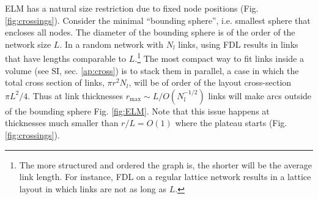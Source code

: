 \documentclass[nofootinbib,preprint,floatfix]{revtex4} %
\begin{document}
ELM has a natural size restriction due to fixed node positions (Fig. \ref{fig:crossings}).
Consider the minimal ``bounding sphere'', i.e. smallest sphere that encloses all nodes. 
The diameter of the bounding sphere is of the order of the network size $L$. 
In a random network with $N_l$ links, using FDL results in links that have lengths comparable to $L$.\footnote{The more structured and ordered the graph is, the shorter will be the average link length. 
For instance, FDL on a regular lattice network results in a lattice layout in which links are not as long as $L$.} 
The most compact way to fit links inside a volume (see SI, sec. \ref{ap:cross}) is to stack them in parallel, a case in which the total cross section of links, $\pi r^2 N_l$, will be of order of the layout cross-section $\pi L^2/4$. 
Thus at link thicknesses $r_\mathrm{max} \sim L/O(N_l^{-1/2})$ links will make arcs outside of the bounding sphere %
Fig. \ref{fig:ELM}. Note that this issue happens at thicknesses much smaller than $r/L = O(1)$ where the plateau starts (Fig. \ref{fig:crossings}).  
\end{document}
